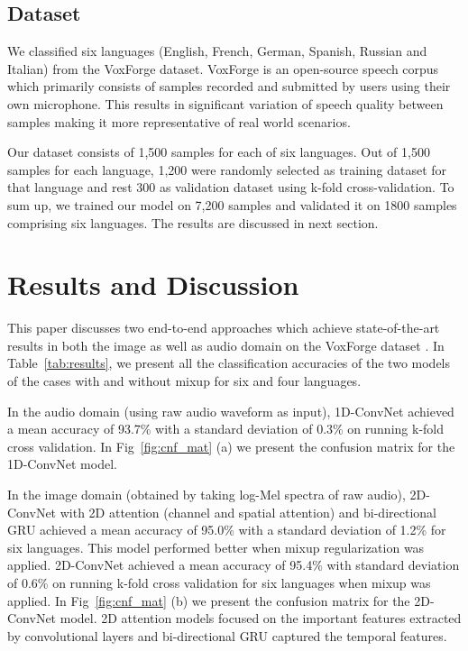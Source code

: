 \documentclass[runningheads]{llncs}
\begin{document}
\subsection{Dataset}
 
We classified six languages (English, French, German, Spanish, Russian and Italian) from the VoxForge \cite{VoxForge.org} dataset. VoxForge is an open-source speech corpus which primarily consists of samples recorded and submitted by users using their own microphone. This results in significant variation of speech quality between samples making it more representative of real world scenarios.

Our dataset consists of 1,500 samples for each of six languages. Out of 1,500 samples for each language, 1,200 were randomly selected as training dataset for that language and rest 300 as validation dataset using k-fold cross-validation. To sum up, we trained our model on 7,200 samples and validated it on 1800 samples comprising six languages. The results are discussed in next section. 

\section{Results and Discussion}
This paper discusses two end-to-end approaches which achieve state-of-the-art results in both the image as well as audio domain on the VoxForge dataset \cite{VoxForge.org}. In Table~\ref{tab:results}, we present all the classification accuracies of the two models of the cases with and without mixup for six and four languages.

In the audio domain (using raw audio waveform as input), 1D-ConvNet achieved a mean accuracy of 93.7\% with a standard deviation of 0.3\% on running k-fold cross validation. In Fig~\ref{fig:cnf_mat} (a) we present the confusion matrix for the 1D-ConvNet model.

In the image domain (obtained by taking log-Mel spectra of raw audio), 2D-ConvNet with 2D attention (channel and spatial attention) and bi-directional GRU achieved a mean accuracy of 95.0\% with a standard deviation of 1.2\% for six languages. This model performed better when mixup regularization was applied. 2D-ConvNet achieved a mean accuracy of 95.4\% with standard deviation of 0.6\% on running k-fold cross validation for six languages when mixup was applied. In Fig~\ref{fig:cnf_mat} (b) we present the confusion matrix for the 2D-ConvNet model. 2D attention models focused on the important features extracted by convolutional layers and bi-directional GRU captured the temporal features. 
\end{document}
